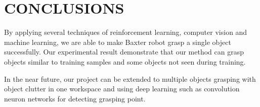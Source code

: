 \documentclass[a4paper, 10pt, conference]{ieeeconf}      %
\begin{document}
\section{CONCLUSIONS}
By applying several techniques of reinforcement learning, computer vision and machine learning, we are able to make Baxter robot grasp a single object successfully. Our experimental result demonstrate that our method can grasp objects similar to training samples and some objects not seen during training.
 
In the near future, our project can be extended to multiple objects grasping with object clutter in one workspace and using deep learning such as convolution neuron networks for detecting grasping point.


\addtolength{\textheight}{-12cm}   %








\end{document}

